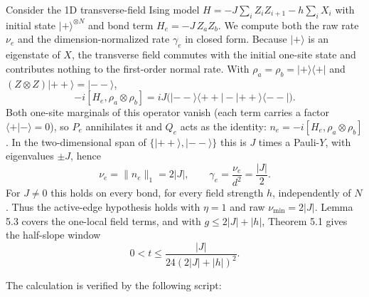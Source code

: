 \documentclass[
  11pt,
]{article}
\begin{document}
Consider the 1D transverse-field Ising model \(H = -J\sum_i Z_i Z_{i+1} - h\sum_i X_i\) with initial state \(|{+}\rangle^{\otimes N}\) and bond term \(H_e = -J\,Z_a Z_b\). We compute both the raw rate \(\nu_e\) and the dimension-normalized rate \(\gamma_e\) in closed form. Because \(|{+}\rangle\) is an eigenstate of \(X\), the transverse field commutes with the initial one-site state and contributes nothing to the first-order normal rate. With \(\rho_a=\rho_b=|{+}\rangle\langle{+}|\) and \((Z\otimes Z)|{++}\rangle=|{--}\rangle\),
\[-i[H_e,\rho_a\otimes\rho_b] = iJ\bigl(|{--}\rangle\langle{++}| - |{++}\rangle\langle{--}|\bigr).\]
Both one-site marginals of this operator vanish (each term carries a factor \(\langle{+}|{-}\rangle=0\)), so \(P_e\) annihilates it and \(Q_e\) acts as the identity: \(n_e = -i[H_e,\rho_a\otimes\rho_b]\). In the two-dimensional span of \(\{|{++}\rangle,|{--}\rangle\}\) this is \(J\) times a Pauli-\(Y\), with eigenvalues \(\pm J\), hence
\[\nu_e=\lVert n_e\rVert_1 = 2|J|,\qquad \gamma_e = \frac{\nu_e}{d^2} = \frac{|J|}{2}.\]
For \(J\ne0\) this holds on every bond, for every field strength \(h\), independently of \(N\). Thus the active-edge hypothesis holds with \(\eta=1\) and raw \(\nu_{\min}=2|J|\). Lemma 5.3 covers the one-local field terms, and with \(g\le2|J|+|h|\), Theorem 5.1 gives the half-slope window
\[0<t\le\frac{|J|}{24(2|J|+|h|)^2}.\]

The calculation is verified by the following script:
\end{document}
